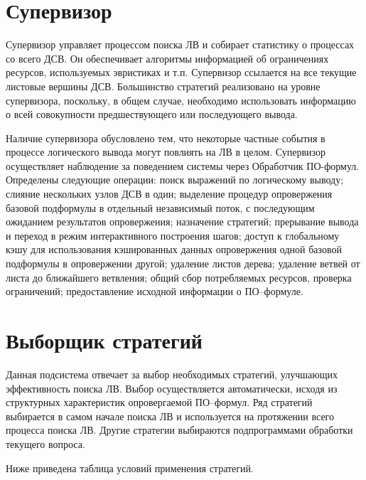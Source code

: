 \section{Супервизор}
Супервизор управляет процессом поиска ЛВ и собирает статистику о процессах со всего ДСВ. Он обеспечивает алгоритмы информацией об ограничениях ресурсов, используемых эвристиках и т.п. Супервизор ссылается на все текущие листовые вершины ДСВ. Большинство стратегий реализовано на уровне супервизора, поскольку, в общем случае, необходимо использовать информацию о всей совокупности предшествующего или последующего вывода.

Наличие супервизора обусловлено тем, что некоторые частные события в процессе логического вывода могут повлиять на ЛВ в целом. Супервизор осуществляет наблюдение за поведением системы через Обработчик ПО-формул. Определены следующие операции: поиск выражений по логическому выводу; слияние нескольких узлов ДСВ в один; выделение процедур опровержения базовой подформулы в отдельный независимый поток, с последующим ожиданием результатов опровержения; назначение стратегий; прерывание вывода и переход в режим интерактивного построения шагов; доступ к глобальному кэшу для использования кэшированных данных опровержения одной базовой подформулы в опровержении другой; удаление листов дерева; удаление ветвей от листа до ближайшего ветвления; общий сбор потребляемых ресурсов, проверка ограничений; предоставление исходной информации о ПО--формуле.



\section{Выборщик стратегий}
Данная подсистема отвечает за выбор необходимых стратегий, улучшающих эффективность поиска ЛВ. Выбор осуществляется автоматически, исходя из структурных характеристик опровергаемой ПО--формул. Ряд стратегий выбирается в самом начале поиска ЛВ и используется на протяжении всего процесса поиска ЛВ. Другие стратегии выбираются подпрограммами обработки текущего вопроса.

Ниже приведена таблица условий применения стратегий.

